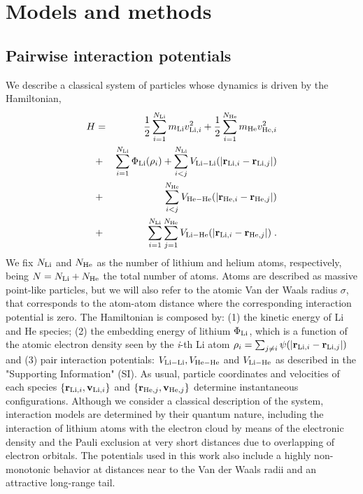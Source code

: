 \documentclass[jcp,amsmath,amssymb,preprint]{revtex4-1}
\begin{document}
\section{\label{methods} Models and methods}
    \subsection*{\label{mmod} Pairwise interaction potentials}

We describe a classical system of particles whose dynamics is driven by the Hamiltonian, 
\begin{eqnarray}
        \label{eq_hamilt}
        H & = & \frac{1}{2}\sum\limits_{i=1}^{N_{\rm Li}} m_{\rm Li}v_{{\rm Li}, i}^2
        +\frac{1}{2}\sum\limits_{i=1}^{N_{\rm He}}m_{\rm He}v_{{\rm He}, i}^2\\
        &+& \sum\limits_{i=1}^{N_{\rm Li}} \Phi_{\rm Li} (\rho_i) + \sum\limits_{i<j}^{N_{\rm Li}}V_{{\rm Li}-{\rm Li}}(|{\bf r}_{{\rm Li},i}-
        {\bf r}_{{\rm Li},j}|) \nonumber \\
        &+&\sum\limits_{i<j}^{N_{\rm He}}V_{{\rm He}-{\rm He}}(|{\bf r}_{{\rm He},i}-
        {\bf r}_{{\rm He},j}|) \nonumber  \\
        &+& \sum\limits_{i=1}^{N_{\rm Li}}
        \sum\limits_{j=1}^{N_{\rm He}}
        V_{{\rm Li}-{\rm He}}(|{\bf r}_{{\rm Li},i}-{\bf r}_{{\rm He},j}|)\;.
        \nonumber
\end{eqnarray}
We fix $N_{\rm Li}$ and $N_{\rm He}$ as the number of lithium and helium atoms, respectively,  being $N=N_{\rm Li}+N_{\rm He}$ the total number of atoms.  Atoms are described as massive point-like particles,  but we will also refer to the atomic Van der Waals radius $\sigma$, that corresponds to the atom-atom distance where the corresponding interaction potential is zero.  The Hamiltonian is composed by: (1) the kinetic energy of Li and He species; (2) the embedding energy of lithium $\Phi_{\rm Li}$, which is a function of the atomic electron density seen by the \textit{i}-th Li atom $\rho_i = \sum_{j \neq i} \psi (|{\bf r}_{{\rm Li},i}-{\bf r}_{{\rm Li},j}|) $\cite{daw1983semiempirical} and (3) pair interaction potentials: $V_{\rm Li-Li},  V_{\rm He-He}$ and $V_{\rm Li-He}$ as described in the "Supporting Information" (SI).  As usual,  particle coordinates and velocities of each species $\{ {\bf r}_{{\rm Li},i}, {\bf v}_{{\rm Li},i} \}$ and $\{ {\bf r}_{{\rm He},j}, {\bf v}_{{\rm He},j} \}$ determine instantaneous configurations.  Although we consider a classical description of the system, interaction models are determined by their quantum nature, including the interaction of lithium atoms with the electron cloud by means of the electronic density and the Pauli exclusion at very short distances due to overlapping of electron orbitals. The potentials used in this work also include a highly non-monotonic behavior at distances near to the Van der Waals radii and an attractive long-range tail.
\end{document}
